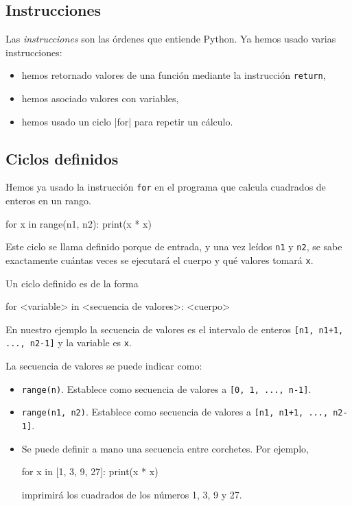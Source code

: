 \subsection{Instrucciones}

Las \emph{instrucciones} son las órdenes que entiende Python. Ya
hemos usado varias instrucciones:

\begin{itemize}
\item hemos retornado valores de una función mediante la
instrucción \lstinline!return!,

\item hemos asociado valores con variables,

\item hemos usado un ciclo |for| para repetir un cálculo.
\end{itemize}

\subsection{Ciclos definidos}
\label{ciclosdef}
Hemos ya usado la instrucción \lstinline!for! en el programa que calcula
cuadrados de enteros en un rango.

\begin{codigo-python-sn}
for x in range(n1, n2):
    print(x * x)
\end{codigo-python-sn}

Este ciclo se llama definido porque de entrada, y una vez leídos
\lstinline!n1! y \lstinline!n2!, se sabe exactamente cuántas veces se ejecutará
el cuerpo y qué valores tomará \lstinline!x!.

Un ciclo definido es de la forma

\begin{codigo-python-sn}
for <variable> in <secuencia de valores>:
    <cuerpo>
\end{codigo-python-sn}

En nuestro ejemplo la secuencia de valores es el intervalo de
enteros \lstinline![n1, n1+1, ..., n2-1]! y la variable es \lstinline!x!.

La secuencia de valores se puede indicar como:

\begin{itemize}
\item \lstinline!range(n)!. Establece como secuencia de valores a
 \lstinline![0, 1, ..., n-1]!.

\item \lstinline!range(n1, n2)!. Establece como secuencia de valores a
\lstinline![n1, n1+1, ..., n2-1]!.

\item Se puede definir a mano una secuencia entre corchetes. Por ejemplo,

\begin{codigo-python-sn}
for x in [1, 3, 9, 27]:
    print(x * x)
\end{codigo-python-sn}

imprimirá los cuadrados de los números 1, 3, 9 y 27.

\end{itemize}

